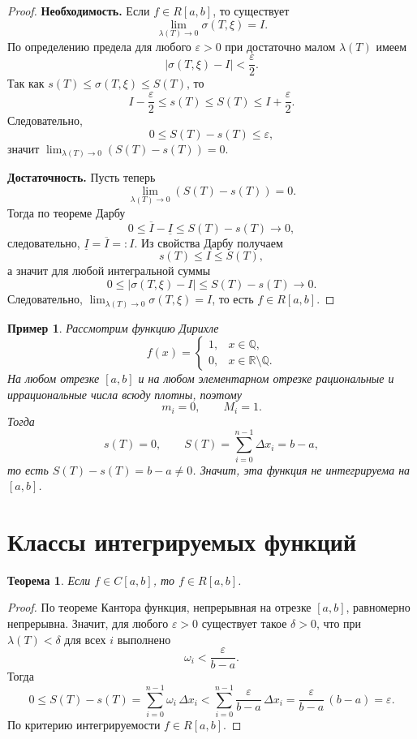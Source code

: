 \documentclass[10pt,a4paper]{article}
\theoremstyle{mystatement}
\newtheorem*{theorem}{Теорема}
\theoremstyle{mydefinition}
\newtheorem*{example}{Пример}
\theoremstyle{myremark}
\begin{document}
\begin{proof}
\textbf{Необходимость.}
Если $f\in R[a,b]$, то существует
\[
\lim_{\lambda(T)\to 0}\sigma(T,\xi)=I.
\]
По определению предела для любого $\varepsilon>0$ при достаточно малом $\lambda(T)$ имеем
\[
|\sigma(T,\xi)-I|<\frac{\varepsilon}{2}.
\]
Так как $s(T)\le \sigma(T,\xi)\le S(T)$, то
\[
I-\frac{\varepsilon}{2}\le s(T)\le S(T)\le I+\frac{\varepsilon}{2}.
\]
Следовательно,
\[
0\le S(T)-s(T)\le \varepsilon,
\]
значит $\lim_{\lambda(T)\to 0}(S(T)-s(T))=0$.

\medskip
\textbf{Достаточность.}
Пусть теперь
\[
\lim_{\lambda(T)\to 0}(S(T)-s(T))=0.
\]
Тогда по теореме Дарбу
\[
0\le \overline I-\underline I\le S(T)-s(T)\to 0,
\]
следовательно, $\underline I=\overline I=:I$.
Из свойства Дарбу получаем
\[
s(T)\le I\le S(T),
\]
а значит для любой интегральной суммы
\[
0\le |\sigma(T,\xi)-I|\le S(T)-s(T)\to 0.
\]
Следовательно, $\lim_{\lambda(T)\to 0}\sigma(T,\xi)=I$, то есть $f\in R[a,b]$.
\end{proof}

\begin{example}
Рассмотрим функцию Дирихле
\[
 f(x)=\begin{cases}
 1, & x\in\mathbb{Q},\\
 0, & x\in\mathbb{R}\setminus\mathbb{Q}.
 \end{cases}
\]
На любом отрезке $[a,b]$ и на любом элементарном отрезке рациональные и иррациональные числа всюду плотны, поэтому
\[
 m_i=0,\qquad M_i=1.
\]
Тогда
\[
 s(T)=0,\qquad S(T)=\sum_{i=0}^{n-1}\Delta x_i=b-a,
\]
то есть $S(T)-s(T)=b-a\neq 0$.
Значит, эта функция не интегрируема на $[a,b]$.
\end{example}

\section{Классы интегрируемых функций}

\begin{theorem}
Если $f\in C[a,b]$, то $f\in R[a,b]$.
\end{theorem}

\begin{proof}
По теореме Кантора функция, непрерывная на отрезке $[a,b]$, равномерно непрерывна.
Значит, для любого $\varepsilon>0$ существует такое $\delta>0$, что при $\lambda(T)<\delta$ для всех $i$ выполнено
\[
\omega_i<\frac{\varepsilon}{b-a}.
\]
Тогда
\[
0\le S(T)-s(T)=\sum_{i=0}^{n-1}\omega_i\,\Delta x_i
<\sum_{i=0}^{n-1}\frac{\varepsilon}{b-a}\,\Delta x_i
=\frac{\varepsilon}{b-a}\,(b-a)=\varepsilon.
\]
По критерию интегрируемости $f\in R[a,b]$.
\end{proof}
\end{document}

